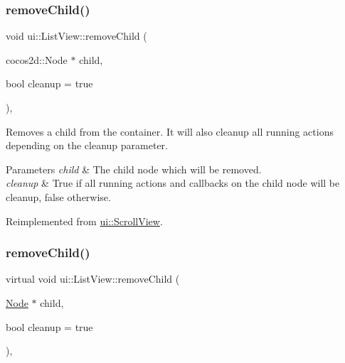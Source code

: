 \subsubsection{\texorpdfstring{remove\+Child()}{removeChild()}\hspace{0.1cm}{\footnotesize\ttfamily [1/2]}}
{\footnotesize\ttfamily void ui\+::\+List\+View\+::remove\+Child (\begin{DoxyParamCaption}\item[{cocos2d\+::\+Node $\ast$}]{child,  }\item[{bool}]{cleanup = {\ttfamily true} }\end{DoxyParamCaption})\hspace{0.3cm}{\ttfamily [override]}, {\ttfamily [virtual]}}

Removes a child from the container. It will also cleanup all running actions depending on the cleanup parameter.


\begin{DoxyParams}{Parameters}
{\em child} & The child node which will be removed. \\
\hline
{\em cleanup} & True if all running actions and callbacks on the child node will be cleanup, false otherwise. \\
\hline
\end{DoxyParams}


Reimplemented from \hyperlink{classui_1_1ScrollView_a678108e716966e8beccc25c0de1d9b29}{ui\+::\+Scroll\+View}.

\mbox{\label{classui_1_1ListView_ace4890246e03a8de66cfe9d0312df365}} 
\subsubsection{\texorpdfstring{remove\+Child()}{removeChild()}\hspace{0.1cm}{\footnotesize\ttfamily [2/2]}}
{\footnotesize\ttfamily virtual void ui\+::\+List\+View\+::remove\+Child (\begin{DoxyParamCaption}\item[{\hyperlink{classNode}{Node} $\ast$}]{child,  }\item[{bool}]{cleanup = {\ttfamily true} }\end{DoxyParamCaption})\hspace{0.3cm}{\ttfamily [override]}, {\ttfamily [virtual]}}

